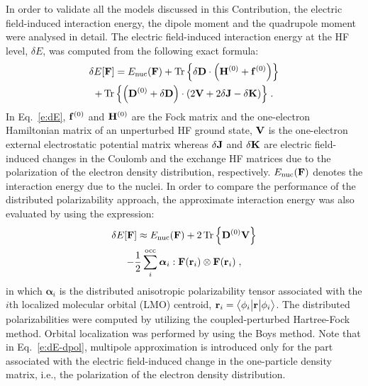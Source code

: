\documentclass[aip,amsmath,amssymb,reprint]{revtex4-1}
\newcommand{\tbraket}[3]{\ensuremath{\bigl\langle {#1} \bigl\lvert {#2} \bigl\lvert {#3} \bigr\rangle}}
\newcommand{\BM}[1]{\bm{#1}}
\DeclareMathOperator{\Tr}{Tr}
\begin{document}
In order to validate all the models discussed in this Contribution,
the electric field\hyp{}induced interaction energy, 
the dipole moment and the quadrupole moment were analysed in detail.
The electric field\hyp{}induced interaction energy at the HF level, $\delta E$,
was computed from the following exact formula:
%
\begin{multline}\label{e:dE}
 \delta E[{\bf F}] = E_{\rm nuc}({\bf F}) +
                     \Tr{\left\{ \delta {\bf D} \cdot
                                \left( {\bf H}^{(0)} + {\bf f}^{(0)} \right) \right\}} \\
                   + \Tr{\left\{ \left( {\bf D}^{(0)} + \delta {\bf D} \right) \cdot
                                \left( 2{\bf V} + 2\delta {\bf J} - \delta {\bf K}\right) \right\}} \;.
\end{multline}
%
In Eq.~\eqref{e:dE}, ${\bf f}^{(0)}$ and ${\bf H}^{(0)}$ are the Fock matrix and 
the one\hyp{}electron Hamiltonian matrix of an unperturbed HF ground state,
${\bf V}$ is the one\hyp{}electron external electrostatic potential matrix whereas $\delta {\bf J}$
and $\delta {\bf K}$ are electric field\hyp{}induced changes in the Coulomb and the exchange HF matrices due to 
the polarization of the electron density distribution, respectively. $E_{\rm nuc}({\bf F})$ denotes the interaction energy
due to the nuclei.
In order to compare the performance of the distributed polarizability approach,
the approximate interaction energy was also evaluated by using the expression:
%
\begin{multline}\label{e:dE-dpol}
 \delta E[{\bf F}] \approx E_{\rm nuc}({\bf F}) + 
                     2 \Tr{\left\{ {\bf D}^{(0)} {\bf V}\right\} }  \\
                   - \frac{1}{2} \sum_i^{\rm occ} {\BM \alpha}_i : {\bf F}({\bf r}_i) \otimes {\bf F}({\bf r}_i) \;,
\end{multline}
%
in which ${\BM \alpha}_i$ is the distributed anisotropic polarizability tensor associated with the
$i$th localized molecular orbital (LMO) centroid, ${\bf r}_i = \tbraket{\phi_i}{\bf r}{\phi_i}$.
The distributed polarizabilities were computed by utilizing the coupled\hyp{}perturbed Hartree\hyp{}Fock
method. Orbital localization was performed by using the Boys method. Note that in Eq.~\eqref{e:dE-dpol}, 
multipole approximation is introduced only for the part associated with the electric field\hyp{}induced
change in the one\hyp{}particle density matrix, i.e., the polarization of the electron density distribution.
\end{document}
